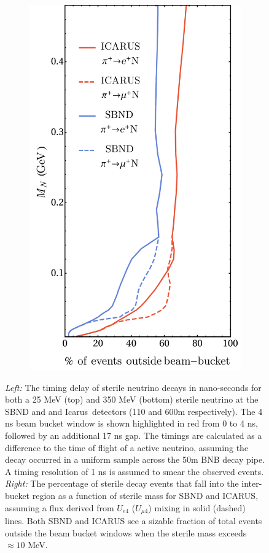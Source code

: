 \documentclass[11pt, a4paper]{article}
\def\icarus{Icarus}
\begin{document}
\begin{figure}[t]
\begin{subfigure}[c]{0.32\textwidth}
\includegraphics[width=\textwidth]{figures/line_plots_long.pdf}
\end{subfigure}
\caption{\label{fig:timing} \emph{Left:} The timing delay of sterile neutrino
decays in nano-seconds for both a 25 MeV (top) and 350 MeV (bottom) sterile
neutrino at the SBND and and \icarus\ detectors (110 and 600m
respectively). The 4 ns beam bucket window is shown highlighted in red from 0
to 4 ns, followed by an additional 17 ns gap. The timings are calculated as a
difference to the time of flight of a active neutrino, assuming the decay
occurred in a uniform sample across the 50m BNB decay pipe. A timing resolution
of 1 ns is assumed to smear the observed events. \emph{Right:} The percentage of sterile decay events that
fall into the inter-bucket region as a function of sterile mass for SBND and
ICARUS, assuming a flux derived from $U_{e4}$ ($U_{\mu 4}$) mixing in solid
(dashed) lines. Both SBND and ICARUS see a sizable fraction of total events
outside the beam bucket windows when the sterile mass exceeds $\approx10$ MeV.
}

\end{figure}
\end{document}
